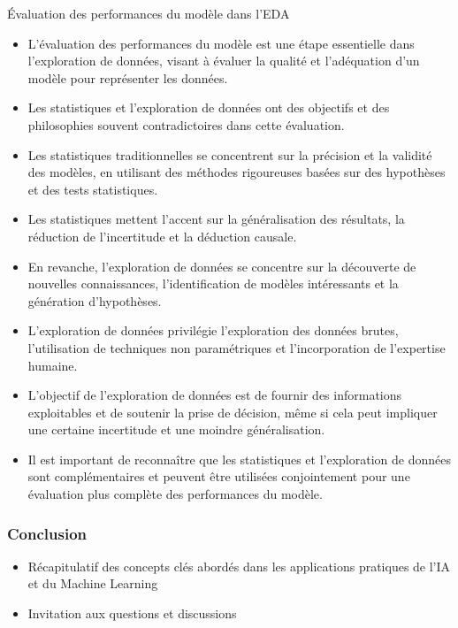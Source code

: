 \documentclass{beamer}
\begin{document}
\begin{frame}{Évaluation des performances du modèle dans l'EDA}
	\begin{itemize}
		\item L'évaluation des performances du modèle est une étape essentielle dans l'exploration de données, visant à évaluer la qualité et l'adéquation d'un modèle pour représenter les données.
		\item Les statistiques et l'exploration de données ont des objectifs et des philosophies souvent contradictoires dans cette évaluation.
		\item Les statistiques traditionnelles se concentrent sur la précision et la validité des modèles, en utilisant des méthodes rigoureuses basées sur des hypothèses et des tests statistiques.
		\item Les statistiques mettent l'accent sur la généralisation des résultats, la réduction de l'incertitude et la déduction causale.
		\item En revanche, l'exploration de données se concentre sur la découverte de nouvelles connaissances, l'identification de modèles intéressants et la génération d'hypothèses.
		\item L'exploration de données privilégie l'exploration des données brutes, l'utilisation de techniques non paramétriques et l'incorporation de l'expertise humaine.
		\item L'objectif de l'exploration de données est de fournir des informations exploitables et de soutenir la prise de décision, même si cela peut impliquer une certaine incertitude et une moindre généralisation.
		\item Il est important de reconnaître que les statistiques et l'exploration de données sont complémentaires et peuvent être utilisées conjointement pour une évaluation plus complète des performances du modèle.
	\end{itemize}
\end{frame}



\begin{frame}
	\frametitle{Conclusion}
	\begin{itemize}
		\item Récapitulatif des concepts clés abordés dans les applications pratiques de l'IA et du Machine Learning
		\item Invitation aux questions et discussions
	\end{itemize}
\end{frame}
\end{document}
